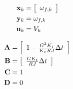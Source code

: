 \begin{align*}
  \mathbf{x}_k &= \left[
  \begin{array}{c}
    \omega_{f,k}
  \end{array}
  \right] \\
  \mathbf{y}_k &= \omega_{f,k} \\
  \mathbf{u}_k &= V_k
\end{align*}

\begin{align}
  \mathbf{A} &= \left[
  \begin{array}{c}
    1 - \frac{G^2 K_t}{K_v RJ} \Delta t
  \end{array}
  \right] \\
  \mathbf{B} &= \left[
  \begin{array}{c}
    \frac{G K_t}{RJ} \Delta t
  \end{array}
  \right] \\
  \mathbf{C} &= 1 \\
  \mathbf{D} &= 0
\end{align}
